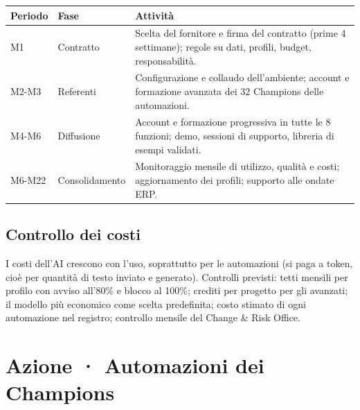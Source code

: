 \documentclass[11pt,a4paper]{article}
\begin{document}
{\small\renewcommand{\arraystretch}{1.25}
\begin{xltabular}{\linewidth}{@{}>{\raggedright\arraybackslash{}\hsize\hspace{0pt}}X>{\raggedright\arraybackslash{}\hsize\hspace{0pt}}X>{\raggedright\arraybackslash{}\hsize\hspace{0pt}}X@{}}
\toprule
\textbf{Periodo} & \textbf{Fase} & \textbf{Attività} \\
\midrule
\endhead
M1 & Contratto & Scelta del fornitore e firma del contratto (prime 4 settimane); regole su dati, profili, budget, responsabilità. \\
M2-M3 & Referenti & Configurazione e collaudo dell'ambiente; account e formazione avanzata dei 32 Champions delle automazioni. \\
M4-M6 & Diffusione & Account e formazione progressiva in tutte le 8 funzioni; demo, sessioni di supporto, libreria di esempi validati. \\
M6-M22 & Consolidamento & Monitoraggio mensile di utilizzo, qualità e costi; aggiornamento dei profili; supporto alle ondate ERP. \\
\bottomrule
\end{xltabular}}

\subsection{Controllo dei costi}\label{sec:10.5}
I costi dell'AI crescono con l'uso, soprattutto per le automazioni (si paga a token, cioè per quantità di testo inviato e generato). Controlli previsti: tetti mensili per profilo con avviso all'80\% e blocco al 100\%; crediti per progetto per gli avanzati; il modello più economico come scelta predefinita; costo stimato di ogni automazione nel registro; controllo mensile del Change \& Risk Office.

\section{Azione · Automazioni dei Champions}\label{sec:11}
\end{document}

